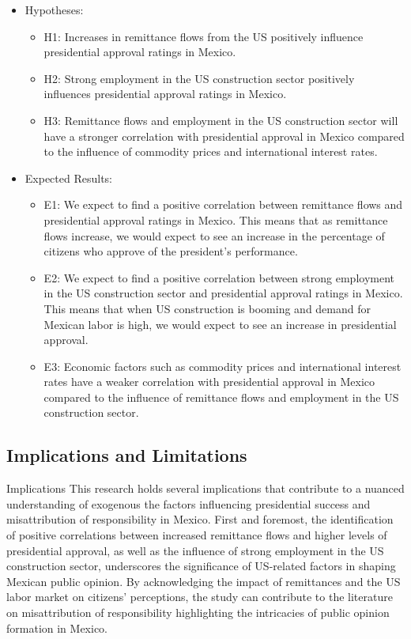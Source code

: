 \documentclass[
]{article}
\providecommand{\tightlist}{%
  \setlength{\itemsep}{0pt}\setlength{\parskip}{0pt}}
\begin{document}
\begin{itemize}
\tightlist
\item
  Hypotheses:

  \begin{itemize}
  \tightlist
  \item
    H1: Increases in remittance flows from the US positively influence
    presidential approval ratings in Mexico.
  \item
    H2: Strong employment in the US construction sector positively
    influences presidential approval ratings in Mexico.
  \item
    H3: Remittance flows and employment in the US construction sector
    will have a stronger correlation with presidential approval in
    Mexico compared to the influence of commodity prices and
    international interest rates.
  \end{itemize}
\item
  Expected Results:

  \begin{itemize}
  \tightlist
  \item
    E1: We expect to find a positive correlation between remittance
    flows and presidential approval ratings in Mexico. This means that
    as remittance flows increase, we would expect to see an increase in
    the percentage of citizens who approve of the president's
    performance.
  \item
    E2: We expect to find a positive correlation between strong
    employment in the US construction sector and presidential approval
    ratings in Mexico. This means that when US construction is booming
    and demand for Mexican labor is high, we would expect to see an
    increase in presidential approval.
  \item
    E3: Economic factors such as commodity prices and international
    interest rates have a weaker correlation with presidential approval
    in Mexico compared to the influence of remittance flows and
    employment in the US construction sector.
  \end{itemize}
\end{itemize}

\hypertarget{implications-and-limitations}{%
\subsection{Implications and
Limitations}\label{implications-and-limitations}}

Implications This research holds several implications that contribute to
a nuanced understanding of exogenous the factors influencing
presidential success and misattribution of responsibility in Mexico.
First and foremost, the identification of positive correlations between
increased remittance flows and higher levels of presidential approval,
as well as the influence of strong employment in the US construction
sector, underscores the significance of US-related factors in shaping
Mexican public opinion. By acknowledging the impact of remittances and
the US labor market on citizens' perceptions, the study can contribute
to the literature on misattribution of responsibility highlighting the
intricacies of public opinion formation in Mexico.
\end{document}
